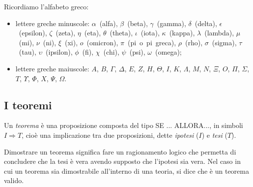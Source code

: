 \begin{inaccessibleblock}
 \begin{center}\end{center}
\end{inaccessibleblock}

Ricordiamo l'alfabeto greco:
\begin{itemize}
\item lettere greche minuscole:  \(\alpha\)~(alfa),  \(\beta\)~(beta),  
\(\gamma\)~(gamma),  \(\delta\)~(delta), \(\epsilon\)~(epsilon), 
\(\zeta\)~(zeta), \(\eta\)~(eta), \(\theta\)~(theta),  \(\iota\)~(iota),  
\(\kappa\)~(kappa), \(\lambda\)~(lambda), \(\mu\)~(mi), \(\nu\)~(ni),  
\(\xi\)~(xi), \(o\)~(omicron), \(\pi\)~(pi~o~pi~greca), \(\rho\)~(rho), 
\(\sigma\)~(sigma), \(\tau\)~(tau), \(\upsilon\)~(ipsilon), \(\phi\)~(fi), 
\(\chi\)~(chi), \(\psi\)~(psi), \(\omega\)~(omega);
\item lettere greche maiuscole: \(A\), \(B\), \( \Gamma \), \( \Delta \), \( E 
\), \( Z \), \( H \), \( \Theta \), \( I \), \( K \), \( \Lambda \), \( M \), \( N \), 
\( \Xi \), \( O \), \( \Pi \), \( \Sigma \), \( T \), \( \Upsilon \), \( \Phi \), \( 
X \), \( \Psi \), \(\Omega \).
\end{itemize}

% 



\subsection{I teoremi}

Un \emph{teorema} è una proposizione composta del tipo SE ... ALLORA..., in 
simboli \(I\Rightarrow 
T\), cioè una implicazione tra due proposizioni, dette \emph{ipotesi} 
(\(I\)) e \emph{tesi} (\(T\)).

Dimostrare un teorema significa fare un ragionamento logico che 
permetta di concludere che la tesi è vera avendo supposto che 
l'ipotesi sia vera. Nel caso in cui un teorema sia dimostrabile 
all'interno di una teoria, si dice che è un teorema valido.

